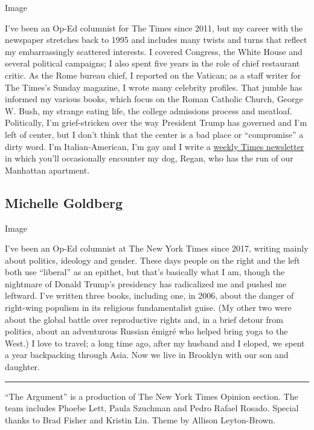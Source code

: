 Image

I've been an Op-Ed columnist for The Times since 2011, but my career
with the newspaper stretches back to 1995 and includes many twists and
turns that reflect my embarrassingly scattered interests. I covered
Congress, the White House and several political campaigns; I also spent
five years in the role of chief restaurant critic. As the Rome bureau
chief, I reported on the Vatican; as a staff writer for The Times's
Sunday magazine, I wrote many celebrity profiles. That jumble has
informed my various books, which focus on the Roman Catholic Church,
George W. Bush, my strange eating life, the college admissions process
and meatloaf. Politically, I'm grief-stricken over the way President
Trump has governed and I'm left of center, but I don't think that the
center is a bad place or ``compromise'' a dirty word. I'm
Italian-American, I'm gay and I write a
\href{https://www.nytimes3xbfgragh.onion/newsletters/frank-bruni}{weekly
Times newsletter} in which you'll occasionally encounter my dog, Regan,
who has the run of our Manhattan apartment.

\hypertarget{michelle-goldberg}{%
\subsection{Michelle Goldberg}\label{michelle-goldberg}}

Image

I've been an Op-Ed columnist at The New York Times since 2017, writing
mainly about politics, ideology and gender. These days people on the
right and the left both use ``liberal'' as an epithet, but that's
basically what I am, though the nightmare of Donald Trump's presidency
has radicalized me and pushed me leftward. I've written three books,
including one, in 2006, about the danger of right-wing populism in its
religious fundamentalist guise. (My other two were about the global
battle over reproductive rights and, in a brief detour from politics,
about an adventurous Russian émigré who helped bring yoga to the West.)
I love to travel; a long time ago, after my husband and I eloped, we
spent a year backpacking through Asia. Now we live in Brooklyn with our
son and daughter.

\begin{center}\rule{0.5\linewidth}{\linethickness}\end{center}

``The Argument'' is a production of The New York Times Opinion section.
The team includes Phoebe Lett, Paula Szuchman and Pedro Rafael Rosado.
Special thanks to Brad Fisher and Kristin Lin. Theme by Allison
Leyton-Brown.

